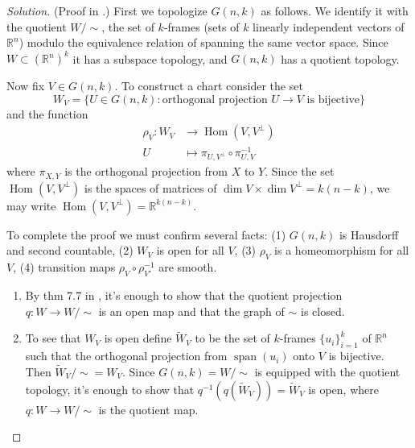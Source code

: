 \begin{proof}[Solution]\leavevmode
	(Proof in \cite{gui2}.) First we topologize \(G(n,k)\) as follows. We identify it with the quotient \(W/ \sim\), the set of \(k\)-frames (sets of \(k\) linearly independent vectors of \(\mathbb{R}^n\)) modulo the equivalence relation of spanning the same vector space. Since \(W \subset (\mathbb{R}^n)^k\) it has a subspace topology, and \(G(n,k)\) has a quotient topology.

	Now fix \(V \in G(n,k)\). To construct a chart consider the set
	\[W_V=\{U \in G(n,k):\text{orthogonal projection \(U \to V\) is bijective} \}\]
and the function
\begin{align*}
	\rho_V: W_V &\longrightarrow \operatorname{Hom}(V,V^\perp) \\
	U &\longmapsto \pi_{U,V^\perp}\circ\pi^{-1}_{U,V}
\end{align*}
where \(\pi_{X,Y}\) is the orthogonal projection from \(X\) to \(Y\). Since the set \(\operatorname{Hom}(V,V^\perp)\) is the spaces of matrices of  \(\dim V \times \dim V^\perp=k (n-k)\), we may write \(\operatorname{Hom}(V,V^\perp)=\mathbb{R}^{k(n-k)}\).

To complete the proof we must confirm several facts: (1) \(G(n,k)\) is Hausdorff and second countable, (2) \(W_V\) is open for all  \(V\), (3) \(\rho_V\) is a homeomorphism for all \(V\), (4) transition maps \(\rho_{V}\circ \rho_{V'}^{-1}\) are smooth.
	
\begin{enumerate}
\item By thm 7.7 in \cite{tus}, it's enough to show that the quotient projection \(q:W \to W/\sim\) is an open map and that the graph of \(\sim\) is closed.
\item To see that \(W_V\) is open define \(\widetilde{W}_V\) to be the set of \(k\)-frames  \(\{u_i\}_{i=1}^k\) of \(\mathbb{R}^n\) such that the orthogonal projection from \(\operatorname{span}(u_i)\) onto \(V\) is bijective. Then \(\widetilde{W}_V/\sim=W_V\). Since \(G(n,k)=W/\sim\) is equipped with the quotient topology, it's enough to show that \(q^{-1}\left(q \left(\widetilde{W}_V\right) \right)=\widetilde{W}_V\) is open, where \(q:W \to W/\sim\) is the quotient map.


\end{enumerate}
\end{proof}

